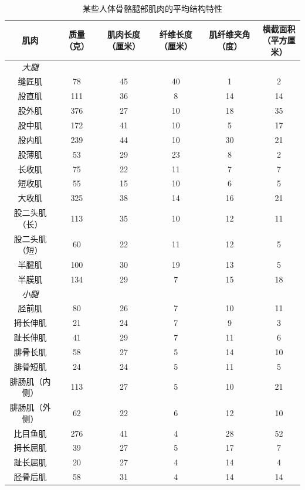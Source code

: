 \begin{table}[htbp]
	\caption{某些人体骨骼腿部肌肉的平均结构特性\label{tab:31_2}}
	\centering
	\begin{tabular}{cccccc}
		\toprule
		肌肉 & 质量（克） & 肌肉长度（厘米） & 纤维长度（厘米） & 肌纤维夹角（度） & \makecell[l]{横截面积\\（平方厘米）} \\
		\midrule
		\textit{大腿} &   &  & & & \\
		缝匠肌 & 78 & 45 & 40 & 1 & 2 \\
		股直肌 & 111 & 36 & 8 & 14 & 14 \\
		股外肌 & 376 & 27 & 10 & 18 & 35 \\
		股中肌 & 172 & 41 & 10 & 5 & 17 \\
		股内肌 & 239 & 44 & 10 & 30 & 21 \\
		股薄肌 & 53 & 29 & 23 & 8 & 2 \\
		长收肌 & 75 & 22 & 11 & 7 & 7 \\
		短收肌 & 55 & 15 & 10 & 6 & 5 \\
		大收肌 & 325 & 38 & 14 & 16 & 21 \\
		股二头肌（长） & 113 & 35 & 10 & 12 & 11 \\
		股二头肌（短） & 60 & 22 & 11 & 12 & 5 \\
		半腱肌 & 100 & 30 & 19 & 13 & 5 \\
		半膜肌 & 134 & 29 & 7 & 15 & 18 \\
		\textit{小腿} &   &  & & & \\
		胫前肌 & 80 & 26 & 7 & 10 & 11 \\
		拇长伸肌 & 21 & 24 & 7 & 9 & 3 \\
		趾长伸肌 & 41 & 29 & 7 & 11 & 6 \\
		腓骨长肌 & 58 & 27 & 5 & 14 & 10 \\
		腓骨短肌 & 24 & 24 & 5 & 11 & 5 \\
		腓肠肌（内侧） & 113 & 27 & 5 & 10 & 21 \\
		腓肠肌（外侧） & 62 & 22 & 6 & 12 & 10 \\
		比目鱼肌 & 276 & 41 & 4 & 28 & 52 \\
		拇长屈肌 & 39 & 27 & 5 & 17 & 7 \\
		趾长屈肌 & 20 & 27 & 4 & 14 & 4 \\
		胫骨后肌 & 58 & 31 & 4 & 14 & 14 \\
		\bottomrule
	\end{tabular}
\end{table}


